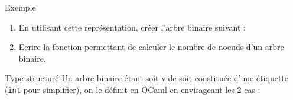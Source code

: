 \documentclass[10pt]{beamer}
\begin{document}
\begin{frame}[fragile]{\Ctitle}{\stitle}
    \begin{exampleblock}{Exemple}
        \begin{enumerate}
        \item<1-> En utilisant cette représentation, créer l'arbre binaire suivant :
        \begin{center}
            {
            }
        \end{center}
        \item<2-> Ecrire la fonction permettant de calculer le nombre de noeuds d'un arbre binaire.
        \end{enumerate}
    \end{exampleblock}
\end{frame}


\begin{frame}[fragile]{\Ctitle}{\stitle}
    \begin{block}{Type structuré}
        Un arbre binaire étant soit vide soit constituée d'une étiquette ({\tt int} pour simplifier), on le définit en OCaml en envisageant les 2 cas :
    \end{block}
\end{frame}
\end{document}
